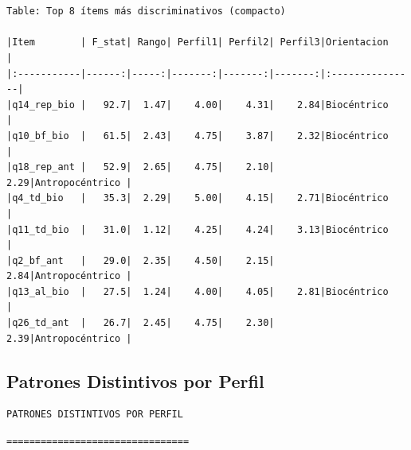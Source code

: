 \documentclass[
  11pt,
  letterpaper,
  DIV=11,
  numbers=noendperiod]{scrartcl}
\begin{document}
\begin{verbatim}


Table: Top 8 ítems más discriminativos (compacto)

|Item        | F_stat| Rango| Perfil1| Perfil2| Perfil3|Orientacion     |
|:-----------|------:|-----:|-------:|-------:|-------:|:---------------|
|q14_rep_bio |   92.7|  1.47|    4.00|    4.31|    2.84|Biocéntrico     |
|q10_bf_bio  |   61.5|  2.43|    4.75|    3.87|    2.32|Biocéntrico     |
|q18_rep_ant |   52.9|  2.65|    4.75|    2.10|    2.29|Antropocéntrico |
|q4_td_bio   |   35.3|  2.29|    5.00|    4.15|    2.71|Biocéntrico     |
|q11_td_bio  |   31.0|  1.12|    4.25|    4.24|    3.13|Biocéntrico     |
|q2_bf_ant   |   29.0|  2.35|    4.50|    2.15|    2.84|Antropocéntrico |
|q13_al_bio  |   27.5|  1.24|    4.00|    4.05|    2.81|Biocéntrico     |
|q26_td_ant  |   26.7|  2.45|    4.75|    2.30|    2.39|Antropocéntrico |
\end{verbatim}

\subsection{Patrones Distintivos por
Perfil}\label{patrones-distintivos-por-perfil}

\begin{verbatim}
PATRONES DISTINTIVOS POR PERFIL
\end{verbatim}

\begin{verbatim}
================================
\end{verbatim}
\end{document}
